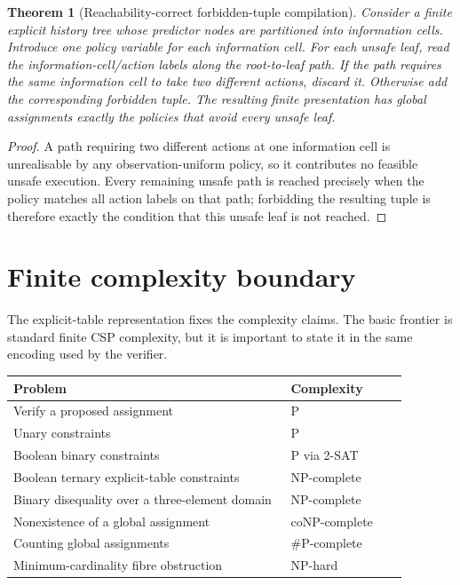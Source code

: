\documentclass[11pt]{article}
\theoremstyle{plain}
\newtheorem{theorem}{Theorem}[section]
\theoremstyle{definition}
\theoremstyle{remark}
\begin{document}
\begin{theorem}[Reachability-correct forbidden-tuple compilation]
Consider a finite explicit history tree whose predictor nodes are partitioned
into information cells.  Introduce one policy variable for each information
cell.  For each unsafe leaf, read the information-cell/action labels along the
root-to-leaf path.  If the path requires the same information cell to take two
different actions, discard it.  Otherwise add the corresponding forbidden tuple.
The resulting finite presentation has global assignments exactly the policies
that avoid every unsafe leaf.
\end{theorem}

\begin{proof}
A path requiring two different actions at one information cell is unrealisable
by any observation-uniform policy, so it contributes no feasible unsafe
execution.  Every remaining unsafe path is reached precisely when the policy
matches all action labels on that path; forbidding the resulting tuple is
therefore exactly the condition that this unsafe leaf is not reached.
\end{proof}

\section{Finite complexity boundary}
\label{sec:complexity}

The explicit-table representation fixes the complexity claims.  The basic
frontier is standard finite CSP complexity, but it is important to state it in
the same encoding used by the verifier.

\begin{center}
\begin{tabular}{@{}p{0.62\linewidth}p{0.26\linewidth}@{}}
\toprule
Problem & Complexity\\
\midrule
Verify a proposed assignment & P\\
Unary constraints & P\\
Boolean binary constraints & P via 2-SAT\\
Boolean ternary explicit-table constraints & NP-complete\\
Binary disequality over a three-element domain & NP-complete\\
Nonexistence of a global assignment & coNP-complete\\
Counting global assignments & \(\#\mathrm P\)-complete\\
Minimum-cardinality fibre obstruction & NP-hard\\
\bottomrule
\end{tabular}
\end{center}
\end{document}
